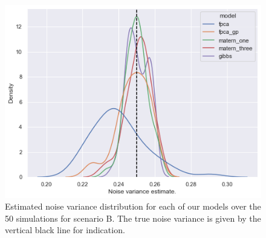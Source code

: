 \begin{figure}
	\centering
	\includegraphics[width=\textwidth]{noise_param_B}
	\caption{Estimated noise variance distribution for each of our models over the 50 simulations for scenario B. The true noise variance is given by the vertical black line for indication.}
	\label{fig:noise_param_B}
\end{figure}

